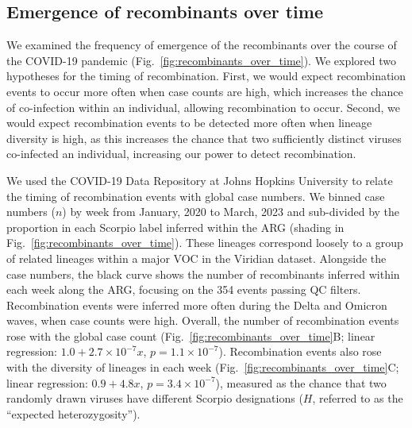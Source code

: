 \documentclass[12pt]{article}
\newcommand{\figref}[1]{Fig.~\ref{#1}}
\begin{document}
\subsection*{Emergence of recombinants over time}

We examined the frequency of emergence of the recombinants
over the course of the COVID-19 pandemic
(\figref{fig:recombinants_over_time}).
We explored two hypotheses for the timing of recombination.
First, we would expect recombination events
to occur more often when case counts are high,
which increases the chance of co-infection within an individual,
allowing recombination to occur.
Second, we would expect recombination events to be detected
more often when lineage diversity is high,
as this increases the chance that
two sufficiently distinct viruses co-infected an individual,
increasing our power to detect recombination.

We used the COVID-19 Data Repository at Johns Hopkins University \cite{Dong2020}
to relate the timing of recombination events with global case numbers. We binned case numbers ($n$) by week from January, 2020 to March, 2023 and
sub-divided by the proportion in each Scorpio label inferred within the ARG
(shading in \figref{fig:recombinants_over_time}).
These lineages correspond loosely to a group
of related lineages within a major VOC in the Viridian dataset.
Alongside the case numbers,
the black curve shows the number of recombinants
inferred within each week along the ARG,
focusing on the 354 events passing QC filters.
Recombination events were inferred more often
during the Delta and Omicron waves, when case counts were high.
Overall, the number of recombination events rose with the global case count
(\figref{fig:recombinants_over_time}B;
linear regression: $1.0 + 2.7\times 10^{-7} x$, $p = 1.1 \times10^{-7}$).
Recombination events also rose with the diversity of lineages in each week
(\figref{fig:recombinants_over_time}C; linear regression:
$0.9 + 4.8 x$, $p = 3.4\times10^{-7}$),
measured as the chance that two randomly drawn viruses have different Scorpio designations
($H$, referred to as the ``expected heterozygosity'').
\end{document}
